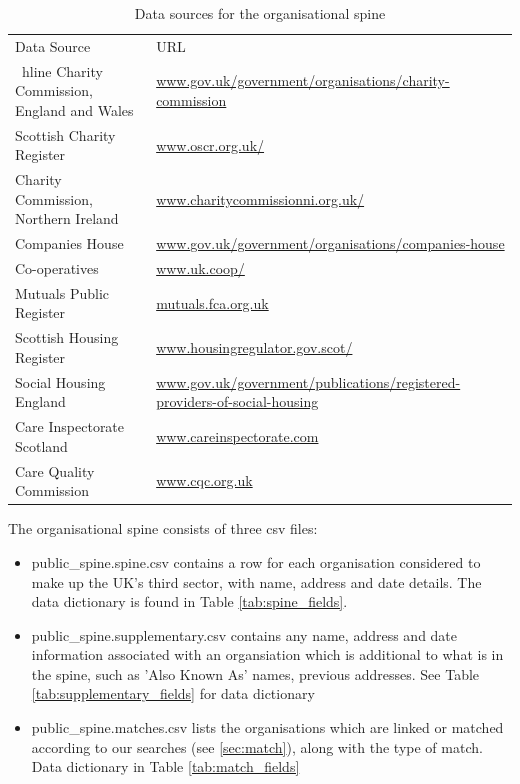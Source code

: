 \documentclass{article}
\begin{document}
\begin{table}[h]
\centering
\begin{tabularx}{\textwidth}{|l|X|}
\hline
Data Source & URL \\ \ hline
Charity Commission, England and Wales	& \url{www.gov.uk/government/organisations/charity-commission}\\ \hline
Scottish Charity Register	& \url{www.oscr.org.uk/}\\ \hline
Charity Commission, Northern Ireland	& \url{www.charitycommissionni.org.uk/} \\ \hline
Companies House 	& \url{www.gov.uk/government/organisations/companies-house} \\ \hline
Co-operatives 	& \url{www.uk.coop/} \\ \hline
Mutuals Public Register 	& \url{mutuals.fca.org.uk} \\ \hline
Scottish Housing Register 	& \url{www.housingregulator.gov.scot/} \\ \hline
Social Housing England 	& \url{www.gov.uk/government/publications/registered-providers-of-social-housing} \\ \hline
Care Inspectorate Scotland 	& \url{www.careinspectorate.com} \\ \hline
Care Quality Commission 	& \url{www.cqc.org.uk}\\ \hline
\end{tabularx}
\caption{Data sources for the organisational spine}
\label{tab:sources}
\end{table}


The organisational spine consists of three csv files: 
\begin{itemize}
\item public\_spine.spine.csv contains a row for each organisation considered to make up the UK's third sector, with name, address and date details. The data dictionary
is found in Table \ref{tab:spine_fields}.
\item public\_spine.supplementary.csv contains any name, address and date information associated with an organsiation which is additional to what is in the spine, 
such as 'Also Known As' names, previous addresses. See Table \ref{tab:supplementary_fields} for data dictionary
\item public\_spine.matches.csv lists the organisations which are linked or matched according to our searches (see \ref{sec:match}), along with the type of match. Data dictionary
in Table \ref{tab:match_fields}
\end{itemize}
\end{document}
